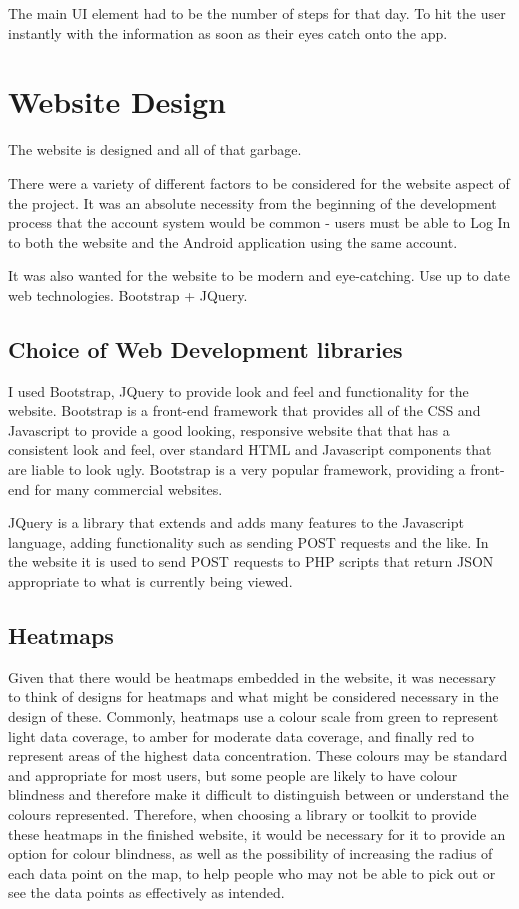 \documentclass{l4proj}
\begin{document}
The main UI element had to be the number of steps for that day. To hit the user instantly with the information as soon as their eyes catch onto the app.

\section{Website Design}

The website is designed and all of that garbage.

There were a variety of different factors to be considered for the website aspect of the project. It was an absolute necessity from the beginning of the development process that the account system would be common - users must be able to Log In to both the website and the Android application using the same account.

It was also wanted for the website to be modern and eye-catching. Use up to date web technologies. Bootstrap + JQuery.

\subsection{Choice of Web Development libraries}

I used Bootstrap, JQuery to provide look and feel and functionality for the website. Bootstrap is a front-end framework that provides all of the CSS and Javascript to provide a good looking, responsive website that that has a consistent look and feel, over standard HTML and Javascript components that are liable to look ugly. Bootstrap is a very popular framework, providing a front-end for many commercial websites.

JQuery is a library that extends and adds many features to the Javascript language, adding functionality such as sending POST requests and the like. In the website it is used to send POST requests to PHP scripts that return JSON appropriate to what is currently being viewed.

\subsection{Heatmaps}

Given that there would be heatmaps embedded in the website, it was necessary to think of designs for heatmaps and what might be considered necessary in the design of these. Commonly, heatmaps use a colour scale from green to represent light data coverage, to amber for moderate data coverage, and finally red to represent areas of the highest data concentration. These colours may be standard and appropriate for most users, but some people are likely to have colour blindness and therefore make it difficult to distinguish between or understand the colours represented. Therefore, when choosing a library or toolkit to provide these heatmaps in the finished website, it would be necessary for it to provide an option for colour blindness, as well as the possibility of increasing the radius of each data point on the map, to help people who may not be able to pick out or see the data points as effectively as intended.
\end{document}
